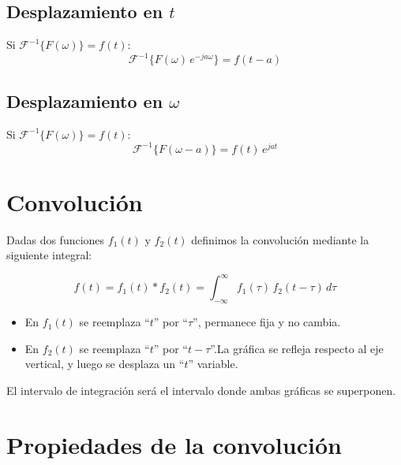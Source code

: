 \subsection{Desplazamiento en $t$}
Si $\mathcal{F}^{-1}\{F(\omega)\}=f(t)$:
\begin{equation}
    \mathcal{F}^{-1}\{F(\omega)\,e^{-ja\omega}\}=f(t-a)
\end{equation}

\subsection{Desplazamiento en $\omega$}
Si $\mathcal{F}^{-1}\{F(\omega)\}=f(t)$:
\begin{equation}
    \mathcal{F}^{-1}\{F(\omega-a)\}=f(t)\,e^{jat}
\end{equation}

\section{Convolución}
Dadas dos funciones $f_1(t)$ y $f_2(t)$ definimos la convolución mediante la
siguiente integral:

\begin{equation}
    f(t)=f_1(t)*f_2(t)=\int_{-\infty}^{\infty}f_1(\tau)\,f_2(t-\tau)\,d\tau
\end{equation}

\begin{itemize}
    \item En $f_1(t)$ se reemplaza ``$t$'' por ``$\tau$'', permanece fija y no
    cambia.
    \item En $f_2(t)$ se reemplaza ``$t$'' por ``$t-\tau$''.La gráfica se
    refleja respecto al eje vertical, y luego se desplaza un ``$t$'' variable.
\end{itemize}

\begin{figure}[H]
    \centering
    \begin{minipage}{.4\textwidth}
        \centering
        
    \end{minipage}
    \begin{minipage}{.4\textwidth}
        \centering
        
    \end{minipage}
\end{figure}
El intervalo de integración será el intervalo donde ambas gráficas se
superponen.

\section{Propiedades de la convolución}

